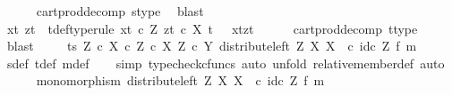 \begin{isabellebody}
\ \ \ \ \isamarkupfalse%
\ cart{\isacharunderscore}{\kern0pt}prod{\isacharunderscore}{\kern0pt}decomp\ s{\isacharunderscore}{\kern0pt}type\ \isamarkupfalse%
\ blast\isanewline
\ \ \isamarkupfalse%
\ xt\ zt\ \ t{\isacharunderscore}{\kern0pt}def{\isacharbrackleft}{\kern0pt}type{\isacharunderscore}{\kern0pt}rule{\isacharbrackright}{\kern0pt}{\isacharcolon}{\kern0pt}\ {\isachardoublequoteopen}xt\ {\isasymin}\isactrlsub c\ Z{\isachardoublequoteclose}\ {\isachardoublequoteopen}zt\ {\isasymin}\isactrlsub c\ X{\isachardoublequoteclose}\ {\isachardoublequoteopen}t\ {\isacharequal}{\kern0pt}\ \ {\isasymlangle}xt{\isacharcomma}{\kern0pt}zt{\isasymrangle}{\isachardoublequoteclose}\isanewline
\ \ \ \ \isamarkupfalse%
\ cart{\isacharunderscore}{\kern0pt}prod{\isacharunderscore}{\kern0pt}decomp\ t{\isacharunderscore}{\kern0pt}type\ \isamarkupfalse%
\ blast\ \isanewline
\isanewline
\ \ \isamarkupfalse%
\ {\isachardoublequoteopen}{\isasymlangle}t{\isacharcomma}{\kern0pt}s{\isasymrangle}\ {\isasymin}\isactrlbsub {\isacharparenleft}{\kern0pt}Z\ {\isasymtimes}\isactrlsub c\ X{\isacharparenright}{\kern0pt}\ {\isasymtimes}\isactrlsub c\ {\isacharparenleft}{\kern0pt}Z\ {\isasymtimes}\isactrlsub c\ X{\isacharparenright}{\kern0pt}\isactrlesub \ {\isacharparenleft}{\kern0pt}Z\ {\isasymtimes}\isactrlsub c\ Y{\isacharcomma}{\kern0pt}\ distribute{\isacharunderscore}{\kern0pt}left\ Z\ X\ X\ \ {\isasymcirc}\isactrlsub c\ {\isacharparenleft}{\kern0pt}id\isactrlsub c\ Z\ {\isasymtimes}\isactrlsub f\ m{\isacharparenright}{\kern0pt}{\isacharparenright}{\kern0pt}{\isachardoublequoteclose}\ \isanewline
\ \ \ \ \isamarkupfalse%
\ s{\isacharunderscore}{\kern0pt}def\ t{\isacharunderscore}{\kern0pt}def\ m{\isacharunderscore}{\kern0pt}def\isanewline
\ \ \isamarkupfalse%
\ {\isacharparenleft}{\kern0pt}simp{\isacharcomma}{\kern0pt}\ typecheck{\isacharunderscore}{\kern0pt}cfuncs{\isacharcomma}{\kern0pt}\ auto{\isacharcomma}{\kern0pt}\ unfold\ relative{\isacharunderscore}{\kern0pt}member{\isacharunderscore}{\kern0pt}def{}{\isacharcomma}{\kern0pt}\ auto{\isacharparenright}{\kern0pt}\isanewline
\ \ \ \ \isamarkupfalse%
\ {\isachardoublequoteopen}monomorphism\ {\isacharparenleft}{\kern0pt}distribute{\isacharunderscore}{\kern0pt}left\ Z\ X\ X\ \ {\isasymcirc}\isactrlsub c\ {\isacharparenleft}{\kern0pt}id\isactrlsub c\ Z\ {\isasymtimes}\isactrlsub f\ m{\isacharparenright}{\kern0pt}{\isacharparenright}{\kern0pt}{\isachardoublequoteclose}\isanewline

\end{isabellebody}

